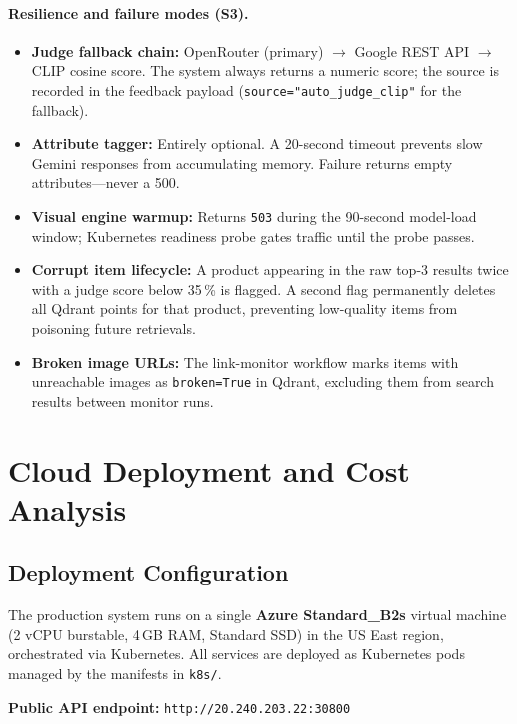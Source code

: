 \documentclass[12pt]{article}
\begin{document}
\paragraph{Resilience and failure modes (S3).}
\begin{itemize}[leftmargin=*, itemsep=2pt]
  \item \textbf{Judge fallback chain:} OpenRouter (primary) $\to$ Google REST API $\to$ CLIP cosine score. The system always returns a numeric score; the source is recorded in the feedback payload (\texttt{source="auto\_judge\_clip"} for the fallback).
  \item \textbf{Attribute tagger:} Entirely optional. A 20-second timeout prevents slow Gemini responses from accumulating memory. Failure returns empty attributes---never a 500.
  \item \textbf{Visual engine warmup:} Returns \texttt{503} during the 90-second model-load window; Kubernetes readiness probe gates traffic until the probe passes.
  \item \textbf{Corrupt item lifecycle:} A product appearing in the raw top-3 results twice with a judge score below 35\,\% is flagged. A second flag permanently deletes all Qdrant points for that product, preventing low-quality items from poisoning future retrievals.
  \item \textbf{Broken image URLs:} The link-monitor workflow marks items with unreachable images as \texttt{broken=True} in Qdrant, excluding them from search results between monitor runs.
\end{itemize}

\section{Cloud Deployment and Cost Analysis}

\subsection{Deployment Configuration}

The production system runs on a single \textbf{Azure Standard\_B2s} virtual machine (2 vCPU burstable, 4\,GB RAM, Standard SSD) in the US East region, orchestrated via Kubernetes. All services are deployed as Kubernetes pods managed by the manifests in \texttt{k8s/}.

\begin{center}
\textbf{Public API endpoint:} \texttt{http://20.240.203.22:30800}
\end{center}
\end{document}
